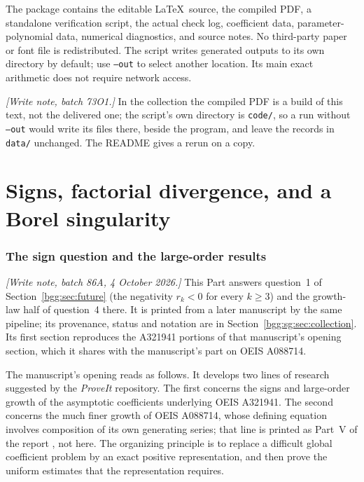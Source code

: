 \documentclass[11pt,a4paper]{article}
\numberwithin{equation}{section}
\theoremstyle{definition}
\theoremstyle{remark}
\theoremstyle{definition}
\begin{document}
The package contains the editable \LaTeX\ source, the compiled PDF, a
standalone verification script, the actual check log, coefficient data,
parameter-polynomial data, numerical diagnostics, and source notes. No
third-party paper or font file is redistributed. The script writes generated
outputs to its own directory by default; use \texttt{--out} to select another
location. Its main exact arithmetic does not require network access.

\emph{[Write note, batch 73O1.]} In the collection the compiled PDF is a
build of this text, not the delivered one; the script's own directory is
\texttt{code/}, so a run without \texttt{--out} would write its files
there, beside the program, and leave the records in \texttt{data/}
unchanged. The README gives a rerun on a copy.

\clearpage
\part{Signs, factorial divergence, and a Borel singularity}
\label{bgg:sg:part:sign}

\setcounter{section}{12}
\renewcommand{\thesection}{\arabic{section}}
\renewcommand{\theHsection}{sg.\arabic{section}}
\makeatletter\gdef\Hy@chapapp{\Hy@chapterstring}\makeatother

\section{The sign question and the large-order results}
\label{bgg:sg:sec:scope}

\emph{[Write note, batch 86A, 4 October 2026.]} This Part answers
question~1 of Section~\ref{bgg:sec:future} (the negativity $r_k<0$ for
every $k\ge3$) and the growth-law half of question~4 there. It is
printed from a later manuscript by the same pipeline; its provenance,
status and notation are in Section~\ref{bgg:sg:sec:collection}. Its
first section reproduces the A321941 portions of that manuscript's
opening section, which it shares with the manuscript's part on OEIS
A088714.

The manuscript's opening reads as follows. It develops two lines of
research suggested by the \emph{ProveIt} repository. The first concerns
the signs and large-order growth of the asymptotic coefficients
underlying OEIS A321941. The second concerns the much finer growth of
OEIS A088714, whose defining equation involves composition of its own
generating series; that line is printed as Part~V of the report
, not here. The organizing principle is
to replace a difficult global coefficient problem by an exact positive
representation, and then prove the uniform estimates that the
representation requires.
\end{document}
